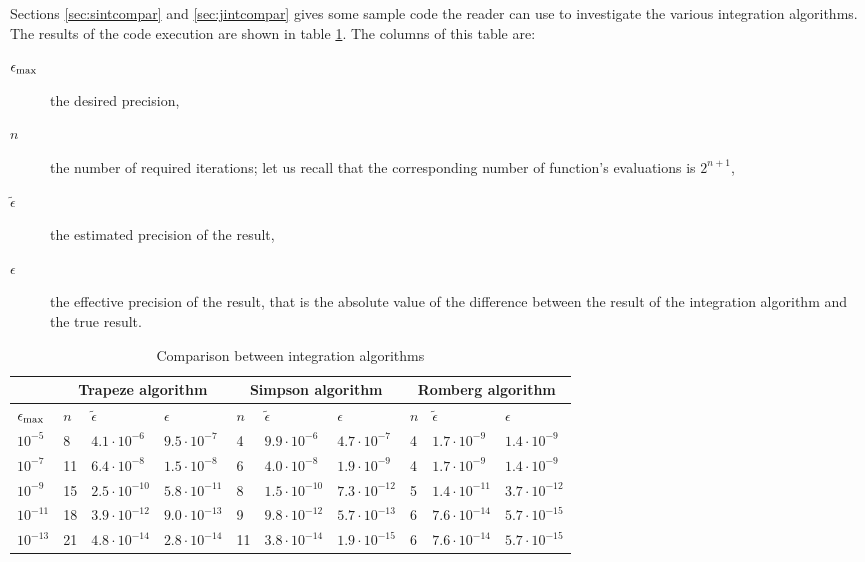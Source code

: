 \documentclass[twoside]{book}
\begin{document}
Sections \ref{sec:sintcompar} and \ref{sec:jintcompar} gives some
sample code the reader can use to investigate the various
integration algorithms. The results of the code execution are
shown in table \ref{tb:intcompar}. The columns of this table are:
\begin{description}
\item[$\epsilon_{\mathop{\rm max}}$]the desired precision,\\
\item[$n$]the number of required iterations; let us recall that the
corresponding number of function's evaluations is $2^{n+1}$,\\
\item[$\tilde{\epsilon}$]the estimated precision of the result,\\
\item[$\epsilon$]the effective precision of the result, that is the absolute value
of the difference between the result of the integration algorithm and the true result.\\
\end{description}

\begin{table}[h]
  \centering
  \caption{Comparison between integration algorithms}\label{tb:intcompar}
\vspace{1 ex}
\begin{tabular}{|l|l|l|l|l|l|l|l|l|l|} \hline
  &\multicolumn{3}{c|}{\bf Trapeze algorithm} &\multicolumn{3}{c|}{\bf Simpson algorithm}&\multicolumn{3}{c|}{\bf Romberg algorithm}  \\ \hline
  $\epsilon_{\mathop{\rm max}}$ & $n$ & $\tilde{\epsilon}$ & $\epsilon$ & $n$ & $\tilde{\epsilon}$ & $\epsilon$ & $n$ & $\tilde{\epsilon}$ & $\epsilon$
  \\ \hline
$10^{-5}$&8&$4.1\cdot 10^{-6}$&$9.5\cdot 10^{-7}$&4&$9.9\cdot
10^{-6}$&$4.7\cdot 10^{-7}$&4&$1.7\cdot 10^{-9}$&$1.4\cdot
10^{-9}$\\ \hline $10^{-7}$&11&$6.4\cdot 10^{-8}$&$1.5\cdot
10^{-8}$&6&$4.0\cdot 10^{-8}$&$1.9\cdot 10^{-9}$&4&$1.7\cdot
10^{-9}$&$1.4\cdot 10^{-9}$\\ \hline $10^{-9}$ &15&$2.5\cdot
10^{-10}$&$5.8\cdot 10^{-11}$&8&$1.5\cdot 10^{-10}$&$7.3\cdot
10^{-12}$&5&$1.4\cdot 10^{-11}$&$3.7\cdot 10^{-12}$\\ \hline
$10^{-11}$ &18&$3.9\cdot 10^{-12}$&$9.0\cdot 10^{-13}$&9&$9.8\cdot
10^{-12}$&$5.7\cdot 10^{-13}$&6&$7.6\cdot 10^{-14}$&$5.7\cdot
10^{-15}$\\ \hline $10^{-13}$&21&$4.8\cdot 10^{-14}$&$2.8\cdot
10^{-14}$&11&$3.8\cdot 10^{-14}$&$1.9\cdot 10^{-15}$&6&$7.6\cdot
10^{-14}$&$5.7\cdot 10^{-15}$\\ \hline
\end{tabular}
\end{table}
\end{document}
